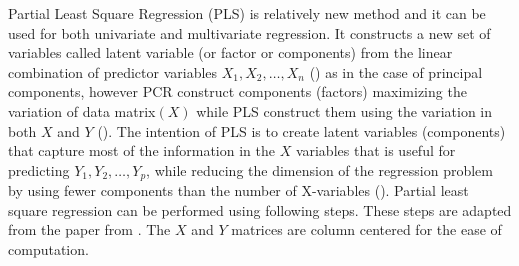 \documentclass[12pt, lot, lof]{thesis}\usepackage[]{graphicx}\usepackage[]{color}
\newcommand{\vl}[2]{\ensuremath{#1_1, #1_2, \ldots, #1_#2}}
\begin{document}
Partial Least Square Regression (PLS) is relatively new method and it can be used for both univariate and multivariate regression. It constructs a new set of variables called latent variable (or factor or components) from the linear combination of predictor variables $\vl{X}{n}$ (\cite{garthwaite1994interpretation}) as in the case of principal components, however PCR construct components (factors) maximizing the variation of data matrix$(X)$ while PLS construct them using the variation in both $X$ and $Y$ (\cite{yeniay2002comparison}). The intention of PLS is to create latent variables (components) that capture most of the information in the $X$ variables that is useful for predicting $\vl{Y}{p}$, while reducing the dimension of the regression problem by using fewer components than the number of X-variables (\cite{garthwaite1994interpretation}). Partial least square regression can be performed using following steps. These steps are adapted from the paper  from \citet{wold2001pls}. The $X$ and $Y$ matrices are column centered for the ease of computation.
\end{document}
